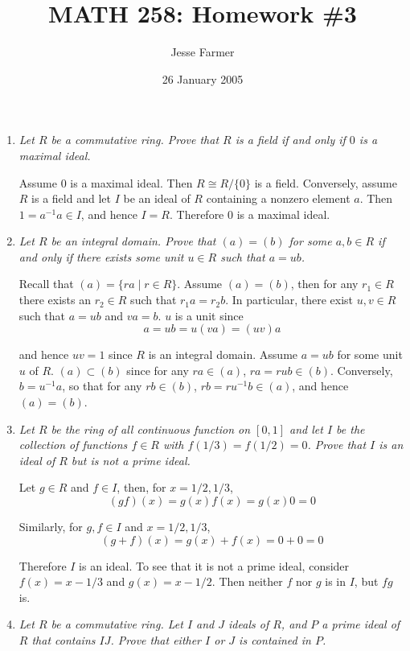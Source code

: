 \documentclass[letterpaper, 11pt]{article}
\title{MATH 258: Homework \#3}
\author{Jesse Farmer}
\date{26 January 2005}
\newcommand{\iso}{\cong}
\begin{document}
\maketitle
\begin{enumerate}

\item \emph{Let $R$ be a commutative ring.  Prove that $R$ is a field if and only if $0$ is a maximal ideal.}

Assume $0$ is a maximal ideal.  Then $R \iso R / \{0\}$ is a field.  Conversely, assume $R$ is a field and let $I$ be an ideal of $R$ containing a nonzero element $a$.  Then $1 = a^{-1}a \in I$, and hence $I = R$.  Therefore $0$ is a maximal ideal.

\item \emph{Let $R$ be an integral domain.  Prove that $(a) = (b)$ for some $a,b \in R$ if and only if there exists some unit $u \in R$ such that $a = ub$.}

Recall that $(a) = \{ra \mid r \in R\}$.  Assume $(a) = (b)$, then for any $r_1 \in R$ there exists an $r_2 \in R$ such that $r_1a = r_2b$.  In particular, there exist $u,v \in R$ such that $a = ub$ and $va = b$.  $u$ is a unit since 
\[
a = ub = u(va) = (uv)a
\]

and hence $uv = 1$ since $R$ is an integral domain.  Assume $a = ub$ for some unit $u$ of $R$.  $(a) \subset (b)$ since for any $ra \in (a)$, $ra = rub \in (b)$.  Conversely, $b = u^{-1}a$, so that for any $rb \in (b)$, $rb = ru^{-1}b \in (a)$, and hence $(a) = (b)$.

\item \emph{Let $R$ be the ring of all continuous function on $[0,1]$ and let $I$ be the collection of functions $f \in R$ with $f(1/3) = f(1/2) = 0$.  Prove that $I$ is an ideal of $R$ but is not a prime ideal.}

Let $g \in R$ and $f \in I$, then, for $x = 1/2, 1/3$,
\[
(gf)(x) = g(x)f(x) = g(x)0 = 0
\]

Similarly, for $g,f \in I$ and $x=1/2, 1/3$,
\[
(g+f)(x) = g(x) + f(x) = 0 + 0 = 0
\]

Therefore $I$ is an ideal.  To see that it is not a prime ideal, consider $f(x) = x - 1/3$ and $g(x) = x - 1/2$.  Then neither $f$ nor $g$ is in $I$, but $fg$ is.

\item \emph{Let $R$ be a commutative ring.  Let $I$ and $J$ ideals of $R$, and $P$ a prime ideal of $R$ that contains $IJ$.  Prove that either $I$ or $J$ is contained in $P$.}


\end{enumerate}
\end{document}
